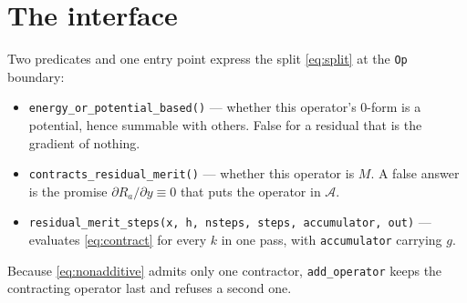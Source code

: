 \documentclass[11pt]{article}
\begin{document}
\section{The interface}

Two predicates and one entry point express the split \eqref{eq:split} at the
\texttt{Op} boundary:
\begin{itemize}[nosep]
  \item \texttt{energy\_or\_potential\_based()} --- whether this operator's
    $0$-form is a potential, hence summable with others.  False for a residual
    that is the gradient of nothing.
  \item \texttt{contracts\_residual\_merit()} --- whether this operator is $M$.
    A false answer is the promise $\partial R_a/\partial y\equiv 0$ that puts the
    operator in $\mathcal{A}$.
  \item \texttt{residual\_merit\_steps(x, h, nsteps, steps, accumulator, out)} ---
    evaluates \eqref{eq:contract} for every $k$ in one pass, with
    \texttt{accumulator} carrying $g$.
\end{itemize}
Because \eqref{eq:nonadditive} admits only one contractor, \texttt{add\_operator}
keeps the contracting operator last and refuses a second one.
\end{document}
